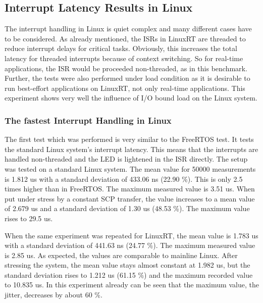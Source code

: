 
\subsection{Interrupt Latency Results in Linux}\label{ss_interrupt_latency_results_in_linux}
The interrupt handling in Linux is quiet complex and many different cases have to be considered. 
As already mentioned, the \acp{ISR} in LinuxRT are threaded to reduce interrupt delays for critical tasks. 
Obviously, this increases the total latency for threaded interrupts because of context switching.
So for real-time applications, the \ac{ISR} would be proceeded non-threaded, as in this benchmark.
Further, the tests were also performed under load condition as it is desirable to run best-effort applications on LinuxRT, not only real-time applications. 
This experiment shows very well the influence of \ac{I/O} bound load on the Linux system.

\subsubsection{The fastest Interrupt Handling in Linux}
The first test which was performed is very similar to the FreeRTOS test. 
It tests the standard Linux system's interrupt latency.
This means that the interrupts are handled non-threaded and the \ac{LED} is lightened in the \ac{ISR} directly.
The setup was tested on a standard Linux system.
The mean value for 50000 measurements is 1.812 us with a standard deviation of 433.06 ns (22.90 \%). 
This is only 2.5 times higher than in FreeRTOS. 
The maximum measured value is 3.51 us.
When put under stress by a constant SCP transfer, the value increases to a mean value of 2.679 us and a standard deviation of 1.30 us (48.53 \%).
The maximum value rises to 29.5 us.
\par
When the same experiment was repeated for LinuxRT, the mean value is 1.783 us with a standard deviation of 441.63 ns (24.77 \%). 
The maximum measured value is 2.85 us.
As expected, the values are comparable to mainline Linux.
After stressing the system, the mean value stays almost constant at 1.982 us, but the standard deviation rises to 1.212 us (61.15 \%) and the maximum recorded value to 10.835 us.
In this experiment already can be seen that the maximum value, the jitter, decreases by about 60 \%.

